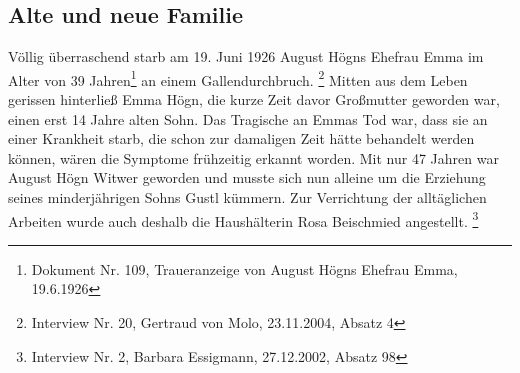\subsection{Alte und neue Familie}
Völlig überraschend starb am 19.
Juni 1926 August Högns Ehefrau Emma im Alter von 39 Jahren\footnote{
Dokument Nr. 109, Traueranzeige von August Högns Ehefrau Emma,
19.6.1926} an einem Gallendurchbruch. \footnote{Interview Nr. 20,
Gertraud von Molo, 23.11.2004, Absatz 4} Mitten aus dem Leben gerissen
hinterließ Emma Högn, die kurze Zeit davor Großmutter geworden war,
einen erst 14 Jahre alten Sohn. Das Tragische an Emmas Tod war, dass
sie an einer Krankheit starb, die schon zur damaligen Zeit hätte
behandelt werden können, wären die Symptome frühzeitig erkannt worden.
Mit nur 47 Jahren war August Högn Witwer geworden und musste sich nun
alleine um die Erziehung seines minderjährigen Sohns Gustl kümmern. Zur
Verrichtung der alltäglichen Arbeiten wurde auch deshalb die
Haushälterin Rosa Beischmied angestellt. \footnote{Interview Nr. 2,
Barbara Essigmann, 27.12.2002, Absatz 98}

